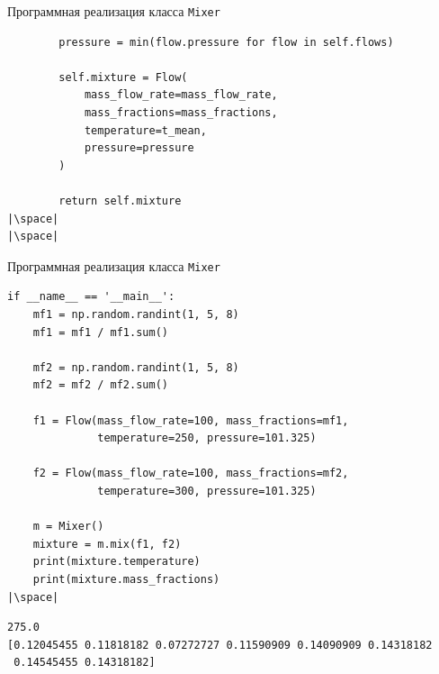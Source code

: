\documentclass[aspectratio=169, mathserif]{beamer}	%
\begin{document}
\begin{frame}[fragile]{Программная реализация класса \texttt{Mixer}}
\scriptsize
\begin{verbatim}
        pressure = min(flow.pressure for flow in self.flows)

        self.mixture = Flow(
            mass_flow_rate=mass_flow_rate,
            mass_fractions=mass_fractions,
            temperature=t_mean,
            pressure=pressure
        )

        return self.mixture
|\space|
|\space|
\end{verbatim}
\vfill
\end{frame}

\begin{frame}[fragile]{Программная реализация класса \texttt{Mixer}}
\scriptsize
\begin{verbatim}
if __name__ == '__main__':
    mf1 = np.random.randint(1, 5, 8)
    mf1 = mf1 / mf1.sum()

    mf2 = np.random.randint(1, 5, 8)
    mf2 = mf2 / mf2.sum()

    f1 = Flow(mass_flow_rate=100, mass_fractions=mf1,
              temperature=250, pressure=101.325)

    f2 = Flow(mass_flow_rate=100, mass_fractions=mf2,
              temperature=300, pressure=101.325)

    m = Mixer()
    mixture = m.mix(f1, f2)
    print(mixture.temperature)
    print(mixture.mass_fractions)
|\space|
\end{verbatim}
\begin{verbatim}
275.0
[0.12045455 0.11818182 0.07272727 0.11590909 0.14090909 0.14318182
 0.14545455 0.14318182]
\end{verbatim}
\vfill
\end{frame}
\end{document}
